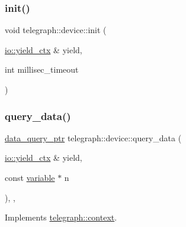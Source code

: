 \mbox{\label{classtelegraph_1_1device_a2f56da47b6e816ac9fd3b1ff2db5d2c9}} 
\subsubsection{\texorpdfstring{init()}{init()}}
{\footnotesize\ttfamily void telegraph\+::device\+::init (\begin{DoxyParamCaption}\item[{\hyperlink{structboost_1_1asio_1_1yield__ctx}{io\+::yield\+\_\+ctx} \&}]{yield,  }\item[{int}]{millisec\+\_\+timeout }\end{DoxyParamCaption})}

\mbox{\label{classtelegraph_1_1device_a4c46c7e98bf5a573a9966fd2cc199021}} 
\subsubsection{\texorpdfstring{query\+\_\+data()}{query\_data()}\hspace{0.1cm}{\footnotesize\ttfamily [1/2]}}
{\footnotesize\ttfamily \hyperlink{namespacetelegraph_a6ffe775ac48dca2a4013b53d692199c8}{data\+\_\+query\+\_\+ptr} telegraph\+::device\+::query\+\_\+data (\begin{DoxyParamCaption}\item[{\hyperlink{structboost_1_1asio_1_1yield__ctx}{io\+::yield\+\_\+ctx} \&}]{yield,  }\item[{const \hyperlink{classtelegraph_1_1variable}{variable} $\ast$}]{n }\end{DoxyParamCaption})\hspace{0.3cm}{\ttfamily [inline]}, {\ttfamily [override]}, {\ttfamily [virtual]}}



Implements \hyperlink{classtelegraph_1_1context_a301114c9b73194507ae58221566a3e57}{telegraph\+::context}.

\mbox{\label{classtelegraph_1_1device_a9a5ef799aadf591a355cc1e50442d762}} 
